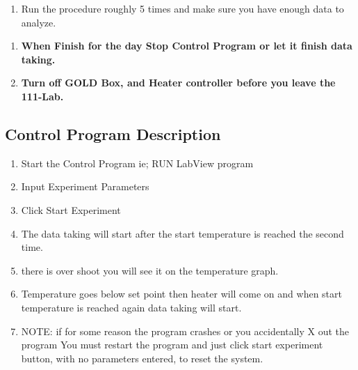 \documentclass{../lab}
\begin{document}
\begin{enumerate}

    \item Run the procedure roughly 5 times and make sure you have enough data to analyze.

\end{enumerate}

\begin{enumerate}
    \item \textbf{When Finish for the day Stop Control Program or let it finish data taking.}

    \item \textbf{Turn off GOLD Box, and Heater controller before you leave the 111-Lab.}

\end{enumerate}

\subsection{Control Program Description}

\begin{enumerate}
    \item Start the Control Program ie; RUN LabView program

    \item Input Experiment Parameters

    \item Click Start Experiment

    \item The data taking will start after the start temperature is reached the second time.

    \item there is over shoot you will see it on the temperature graph.

    \item Temperature goes below set point then heater will come on and when start temperature is reached again data taking will start.

    \item NOTE: if for some reason the program crashes or you accidentally X out the program You must restart the program and just click start experiment button, with no parameters entered, to reset the system.

\end{enumerate}
\end{document}
